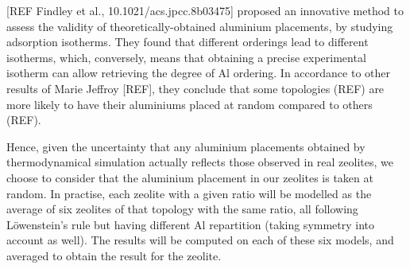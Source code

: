 \documentclass[main.tex]{subfiles}
\begin{document}
[REF Findley et al., 10.1021/acs.jpcc.8b03475] proposed an innovative method to assess the validity of theoretically-obtained aluminium placements, by studying  adsorption isotherms. They found that different \SiAl orderings lead to different isotherms, which, conversely, means that obtaining a precise experimental isotherm can allow retrieving the degree of Al ordering. In accordance to other results of Marie Jeffroy [REF], they conclude that some topologies (REF) are more likely to have their aluminiums placed at random compared to others (REF).

Hence, given the uncertainty that any aluminium placements obtained by thermodynamical simulation actually reflects those observed in real zeolites, we choose to consider that the aluminium placement in our zeolites is taken at random. In practise, each zeolite with a given \SiAl ratio will be modelled as the average of six zeolites of that topology with the same \SiAl ratio, all following L\"owenstein's rule but having different Al repartition (taking symmetry into account as well). The results will be computed on each of these six models, and averaged to obtain the result for the zeolite.
\end{document}
